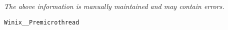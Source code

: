 \label{pkg:winix\_\_premicrothread}

{\tiny \it The above information is manually maintained and may contain errors.}
\begin{verbatim}
Winix__Premicrothread
\end{verbatim}
